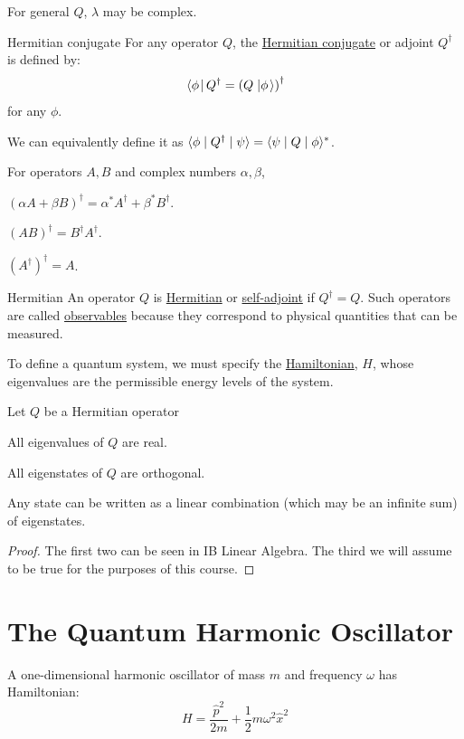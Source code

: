 \documentclass[../Main.tex]{subfiles}
\begin{document}
For general $Q$, $\lambda$ may be complex.
\begin{definition}{Hermitian conjugate}
    For any operator $Q$, the \underline{Hermitian conjugate} or adjoint $Q^\dagger$ is defined by:
    \begin{equation*}
        \left.\left\langle\phi\right.\right| Q^\dagger = \left(Q\left.\left|\phi\right.\right\rangle\right)^\dagger
    \end{equation*}
    for any $\phi$.
\end{definition}
We can equivalently define it as $\langle\phi\mid Q^\dagger\mid\psi\rangle = \langle\psi\mid Q\mid\phi\rangle^*$.
\begin{propositions}{
        For operators $A, B$ and complex numbers $\alpha, \beta$,
        \label{propsHermConjProps}
    }
    \item $(\alpha A + \beta B)^\dagger = \alpha^* A^\dagger + \beta^* B^\dagger$.
    \item $(AB)^\dagger = B^\dagger A^\dagger$.
    \item $(A^\dagger)^\dagger = A$.
\end{propositions}
\begin{definition}{Hermitian}
    An operator $Q$ is \underline{Hermitian} or \underline{self-adjoint} if $Q^\dagger = Q$. Such operators are called \underline{observables} because they correspond to physical quantities that can be measured.
\end{definition}
To define a quantum system, we must specify the \underline{Hamiltonian}, $H$, whose eigenvalues are the permissible energy levels of the system.

\begin{propositions}{
        Let $Q$ be a Hermitian operator
        \label{propsHermitian}
    }
    \item All eigenvalues of $Q$ are real.
    \item All eigenstates of $Q$ are orthogonal.
    \item Any state can be written as a linear combination (which may be an infinite sum) of eigenstates.
\end{propositions}
\begin{proof}
    The first two can be seen in IB Linear Algebra. The third we will assume to be true for the purposes of this course.
\end{proof}
\section{The Quantum Harmonic Oscillator}
A one-dimensional harmonic oscillator of mass $m$ and frequency $\omega$ has Hamiltonian:
\begin{equation*}
    H = \frac{\hat{p}^2}{2m} + \frac12 m\omega^2\hat{x}^2 
\end{equation*}
\end{document}

